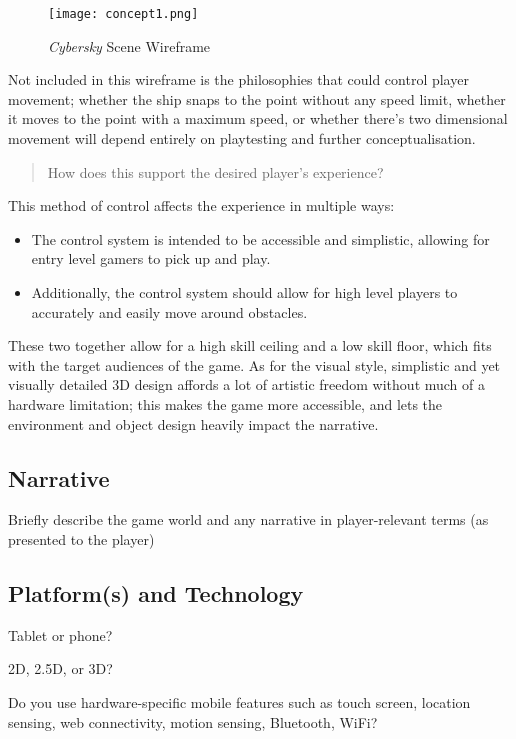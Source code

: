 \documentclass{scrartcl}
\begin{document}
\begin{figure}[!h]
  \centering
  \texttt{[image: concept1.png]}
  \caption[\textit{Cybersky}]{\textit{Cybersky} Scene Wireframe}
\end{figure}

Not included in this wireframe is the philosophies that could control player movement; whether the ship snaps to the point without any speed limit, whether it moves to the point with a maximum speed, or whether there's two dimensional movement will depend entirely on playtesting and further conceptualisation.

\begin{quote}
  How does this support the desired player’s experience?
\end{quote}

This method of control affects the experience in multiple ways:

\begin{itemize}
  \item The control system is intended to be accessible and simplistic, allowing for entry level gamers to pick up and play.
  \item Additionally, the control system should allow for high level players to accurately and easily move around obstacles.
\end{itemize}

These two together allow for a high skill ceiling and a low skill floor, which fits with the target audiences of the game. As for the visual style, simplistic and yet visually detailed 3D design affords a lot of artistic freedom without much of a hardware limitation; this makes the game more accessible, and lets the environment and object design heavily impact the narrative.

\subsection{Narrative}

Briefly describe the game world and any narrative in player-relevant terms (as presented to the player)

\subsection{Platform(s) and Technology}

Tablet or phone?

2D, 2.5D, or 3D?

Do you use hardware-specific mobile features such as touch screen, location sensing, web connectivity, motion sensing, Bluetooth, WiFi?
\end{document}
